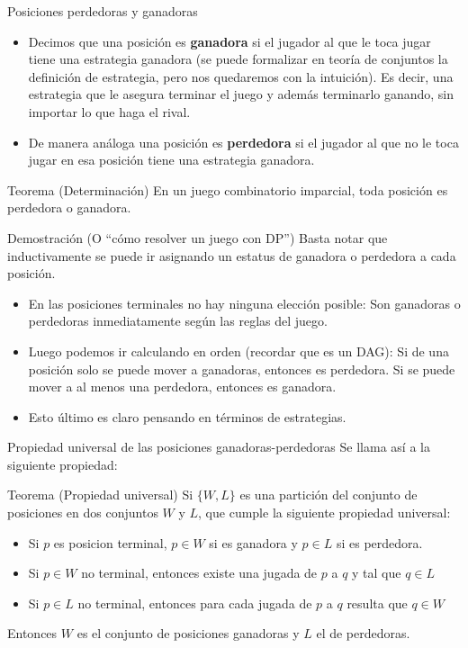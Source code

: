 \documentclass{beamer}
\begin{document}
\begin{frame}{Posiciones perdedoras y ganadoras}
  \begin{itemize}
  \item Decimos que una posición es \textbf{ganadora} si el jugador al que le toca jugar tiene una estrategia ganadora (se puede
  formalizar en teoría de conjuntos la definición de estrategia, pero nos quedaremos con la intuición). Es decir, una estrategia
  que le asegura terminar el juego y además terminarlo ganando, sin importar lo que haga el rival.
  \item De manera análoga una posición es \textbf{perdedora} si el jugador al que no le toca jugar en esa posición tiene una estrategia
  ganadora.
  \end{itemize}
  \begin{block}{Teorema (Determinación)}
    En un juego combinatorio imparcial, toda posición es perdedora o ganadora.
  \end{block}
\end{frame}

\begin{frame}{Demostración (O ``cómo resolver un juego con DP'')}
  Basta notar que inductivamente se puede ir asignando un estatus de ganadora o perdedora a cada posición.
  \begin{itemize}
  \item En las posiciones terminales no hay ninguna elección posible: Son ganadoras o perdedoras inmediatamente según las reglas del juego.
  \item Luego podemos ir calculando en orden (recordar que es un DAG): Si de una posición solo se puede mover a ganadoras, entonces es perdedora.
  Si se puede mover a al menos una perdedora, entonces es ganadora.
  \item Esto último es claro pensando en términos de estrategias.
  \end{itemize}
\end{frame}

\begin{frame}{Propiedad universal de las posiciones ganadoras-perdedoras}
  Se llama así a la siguiente propiedad:
  \begin{block}{Teorema (Propiedad universal)}
   Si $\{W,L\}$ es una partición del conjunto de posiciones en dos conjuntos $W$ y $L$, que cumple la siguiente propiedad universal:
     \begin{itemize}
        \item Si $p$ es posicion terminal, $p \in W$ si es ganadora y $p \in L$ si es perdedora.
        \item Si $p \in W$ no terminal, entonces existe una jugada de $p$ a $q$ y tal que $q \in L$
        \item Si $p \in L$ no terminal, entonces para cada jugada de $p$ a $q$ resulta que $q \in W$
     \end{itemize}
   Entonces $W$ es el conjunto de posiciones ganadoras y $L$ el de perdedoras.
  \end{block}
\end{frame}
\end{document}
